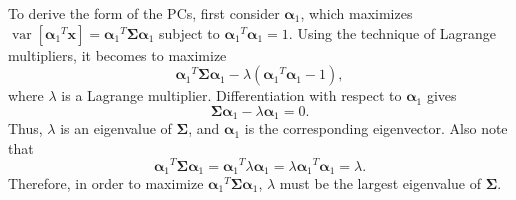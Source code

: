 To derive the form of the PCs, first consider $\boldsymbol{\alpha}_1$, which maximizes $\operatorname{var}\left[{\boldsymbol{\alpha}_1}^T\mathbf{x}\right]={\boldsymbol{\alpha}_1}^T\boldsymbol{\Sigma}\boldsymbol{\alpha}_1$ subject to ${\boldsymbol{\alpha}_1}^T\boldsymbol{\alpha}_1=1$. Using the technique of Lagrange multipliers, it becomes to maximize
\begin{equation}
	{\boldsymbol{\alpha}_1}^T\boldsymbol{\Sigma}\boldsymbol{\alpha}_1-\lambda ({\boldsymbol{\alpha}_1}^T\boldsymbol{\alpha}_1-1),
\end{equation}
where $\lambda$ is a Lagrange multiplier. Differentiation with respect to $\boldsymbol{\alpha}_1$ gives
\begin{equation}
	\boldsymbol{\Sigma}\boldsymbol{\alpha}_1-\lambda \boldsymbol{\alpha}_1=0.
\end{equation}
Thus, $\lambda$ is an eigenvalue of $\boldsymbol{\Sigma}$, and $\boldsymbol{\alpha}_1$ is the corresponding eigenvector. Also note that
\begin{equation}
	{\boldsymbol{\alpha}_1}^T\boldsymbol{\Sigma} \boldsymbol{\alpha}_1={\boldsymbol{\alpha}_1}^T \lambda \boldsymbol{\alpha}_1=\lambda {\boldsymbol{\alpha}_1}^T \boldsymbol{\alpha}_1=\lambda.
\end{equation}
Therefore, in order to maximize ${\boldsymbol{\alpha}_1}^T\boldsymbol{\Sigma} \boldsymbol{\alpha}_1$, $\lambda$ must be the largest eigenvalue of $\boldsymbol{\Sigma}$.


